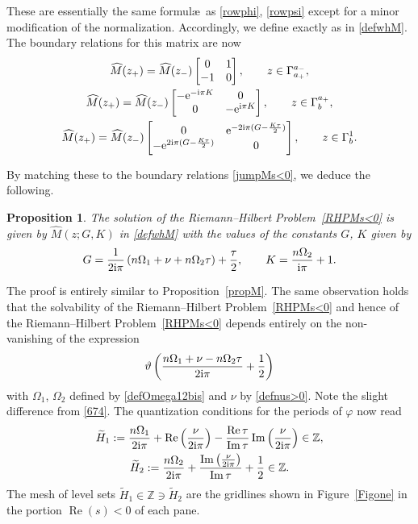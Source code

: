 \documentclass[10pt,a4paper]{amsart}
\numberwithin{equation}{section}
\newtheorem{Proposition}[Theorem]{Proposition}
\theoremstyle{definition}
\def\le{\left}
\def\ri{\right}
\def \wt{ \widetilde }
\def \wh{\widehat}
\def\be{\begin{equation}}
\def\ee{\end{equation}}
\def\Z{{\mathbb Z}}
\def \Re{\operatorname{Re} }
\def \Im {\operatorname{Im} }
\begin{document}
These are essentially the same formul\ae\ as \eqref{rowphi}, \eqref{rowpsi} except for a minor modification of the normalization.
Accordingly, we define \smash{$\wh M(z;G,K,\infty)$} exactly as in \eqref{defwhM}.
The boundary relations for this matrix \smash{$\wh M$} are now
\begin{gather*}%
\wh M(z_+)= \wh M(z_-) \begin{bmatrix}
0 & 1 \\
-1 & 0
\end{bmatrix},\qquad z\in \Gamma_{a_+}^{a_-},
\\
\wh M(z_+)= \wh M(z_-)
\begin{bmatrix}
-{\rm e}^{-{\rm i}\pi K} & 0 \\
0 & -{\rm e}^{{\rm i}\pi K}
\end{bmatrix},
\qquad z\in \Gamma_b^{a_+},
\\
\wh M(z_+)= \wh M(z_-) \begin{bmatrix}
0 & {\rm e}^{-2{\rm i}\pi(G - \frac {K\tau}2) }\\
-{\rm e}^{2{\rm i}\pi(G - \frac {K\tau}2) }& 0
\end{bmatrix},\qquad z\in \Gamma_b^{1}.
\end{gather*}

By matching these to the boundary relations \eqref{jumpMs<0}, we deduce the following.
\begin{Proposition}\label{propM<0}
The solution of the Riemann--Hilbert Problem~{\rm\ref{RHPMs<0}} is given by $\wh M(z;G,K)$ in \eqref{defwhM} with the values of the constants $G$, $K$ given by
\be
\label{defGs<0}
G= \frac 1{2{\rm i}\pi} \le(n\Omega_1 + \nu + n \Omega_2\tau\ri) + \frac {\tau}2,\qquad
K = \frac {n\Omega_2}{{\rm i}\pi} + 1.
\ee
\end{Proposition}
The proof is entirely similar to Proposition~\ref{propM}.
The same observation holds that the solvability of the Riemann--Hilbert Problem~\ref{RHPMs<0} and hence of the Riemann--Hilbert Problem~\ref{RHPMs<0} depends entirely on the non-vanishing of the expression
\be
\label{meshs<0}
\vartheta\le(\frac {n\Omega_1 + \nu - n \Omega_2\tau }{2{\rm i}\pi} + \frac 12 \ri)
\ee
with $\Omega_1$, $\Omega_2$ defined by \eqref{defOmega12bis} and $\nu$ by \eqref{defnus>0}. Note the slight difference from \eqref{674}.
The quantization conditions for the periods of $\varphi$ now read
\begin{gather}
\wt H_1:= \frac{n\Omega_1}{2{\rm i}\pi} + \Re\le(\frac {\nu} {2{\rm i}\pi} \ri) - \frac {\Re \tau}{\Im\tau} \Im\le(\frac {\nu}{2{\rm i}\pi}\ri) \in \Z,\nonumber
\\
\wt H_2:= \frac{n\Omega_2}{2{\rm i}\pi} + \frac {\Im\le(\frac{\nu}{2{\rm i}\pi}\ri)}{\Im \tau} + \frac 1 2 \in \Z.\label{quantcond<0}
\end{gather}
The mesh of level sets $ \wt H_1\in \Z \ni \wt H_2$ are the gridlines shown in Figure~\ref{Figone} in the portion $\Re (s)<0$ of each pane.
%
\end{document}
